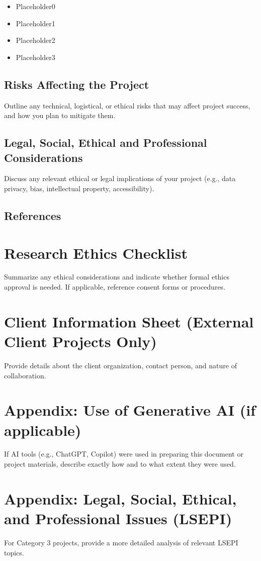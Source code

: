 \documentclass[12pt,a4paper]{article}
\begin{document}
\begin{itemize}[noitemsep]
    \item Placeholder0
    \item Placeholder1
    \item Placeholder2
    \item Placeholder3
\end{itemize}

\subsection{Risks Affecting the Project}
Outline any technical, logistical, or ethical risks that may affect project success, and how you plan to mitigate them.

\subsection{Legal, Social, Ethical and Professional Considerations}
Discuss any relevant ethical or legal implications of your project (e.g., data privacy, bias, intellectual property, accessibility).

\subsection{References}
\printbibliography

\newpage
\section{Research Ethics Checklist}
Summarize any ethical considerations and indicate whether formal ethics approval is needed. If applicable, reference consent forms or procedures.

\newpage
\section{Client Information Sheet (External Client Projects Only)}
Provide details about the client organization, contact person, and nature of collaboration.

\newpage
\section{Appendix: Use of Generative AI (if applicable)}
If AI tools (e.g., ChatGPT, Copilot) were used in preparing this document or project materials, describe exactly how and to what extent they were used.

\newpage
\section{Appendix: Legal, Social, Ethical, and Professional Issues (LSEPI)}
For Category 3 projects, provide a more detailed analysis of relevant LSEPI topics.
\end{document}
